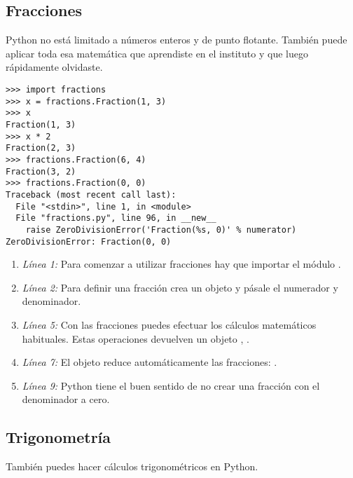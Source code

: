 \subsection{Fracciones}

Python no está limitado a números enteros y de punto flotante. También puede aplicar toda esa matemática que aprendiste en el instituto y que luego rápidamente olvidaste.

\noindent\begin{minipage}{\textwidth}
\begin{lstlisting}[mathescape=True]
>>> import fractions
>>> x = fractions.Fraction(1, 3)
>>> x
Fraction(1, 3)
>>> x * 2
Fraction(2, 3)
>>> fractions.Fraction(6, 4)
Fraction(3, 2)
>>> fractions.Fraction(0, 0)
Traceback (most recent call last):
  File "<stdin>", line 1, in <module>
  File "fractions.py", line 96, in __new__
    raise ZeroDivisionError('Fraction(%s, 0)' % numerator)
ZeroDivisionError: Fraction(0, 0)
\end{lstlisting}
\end{minipage}

\begin{enumerate}

\item \emph{Línea 1:} Para comenzar a utilizar fracciones hay que importar el módulo .

\item \emph{Línea 2:} Para definir una fracción crea un objeto  y pásale el numerador y denominador.

\item \emph{Línea 5:} Con las fracciones puedes efectuar los cálculos matemáticos habituales. Estas operaciones devuelven un objeto , .

\item \emph{Línea 7:} El objeto  reduce automáticamente las fracciones: .

\item \emph{Línea 9:} Python tiene el buen sentido de no crear una fracción con el denominador a cero.

\end{enumerate}

\subsection{Trigonometría}

También puedes hacer cálculos trigonométricos en Python.

